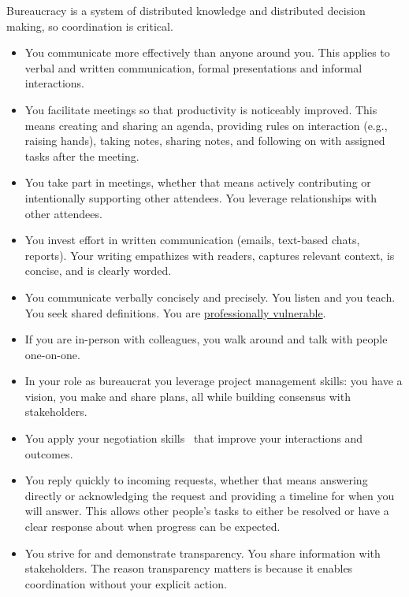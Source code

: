 Bureaucracy is a system of distributed knowledge and distributed decision making, so coordination is critical. 
\begin{itemize}
    \item You communicate more effectively than anyone around you. This applies to verbal and written communication, formal presentations and informal interactions. 
    \item You facilitate meetings so that productivity is noticeably improved. This means creating and sharing an agenda, providing rules on interaction (e.g., raising hands), taking notes, sharing notes, and following on with assigned tasks after the meeting.
    \item You take part in meetings, whether that means actively contributing or intentionally supporting other attendees. You leverage relationships with other attendees. 
    \item You invest effort in written communication (emails, text-based chats, reports). Your writing empathizes with readers, captures relevant context, is concise, and is clearly worded.
    \item You communicate verbally concisely and precisely. You listen and you teach. You seek shared definitions. You are \hyperref[sec:professional-vulnerablity]{professionally vulnerable}. 
    \item If you are in-person with colleagues, you walk around and talk with people one-on-one.  
    \item In your role as bureaucrat you leverage project management skills: you have a vision, you make and share plans, all while building consensus with stakeholders.
    \item You apply your negotiation skills~\cite{1982_Cohen} that improve your interactions and outcomes.
    \item You reply quickly to incoming requests, whether that means answering directly or acknowledging the request and providing a timeline for when you will answer. This allows other people's tasks to either be resolved or have a clear response about when progress can be expected. 
    \item You strive for and demonstrate transparency. You share information with stakeholders. The reason transparency matters is because it enables coordination without your explicit action.
\end{itemize}



